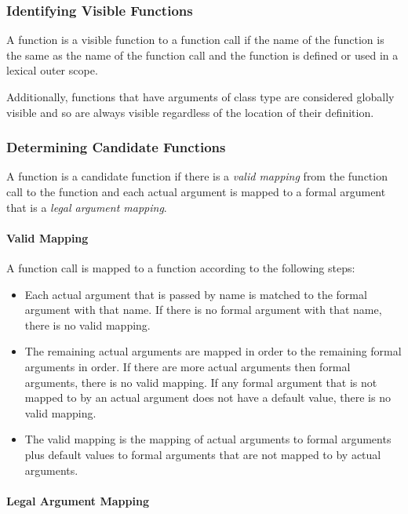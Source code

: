 \subsubsection{Identifying Visible Functions}
\label{Identifying_Visible_Functions}

A function is a visible function to a function call if the name of the
function is the same as the name of the function call and the function
is defined or used in a lexical outer scope.

Additionally, functions that have arguments of class type are
considered globally visible and so are always visible regardless of
the location of their definition.

\subsubsection{Determining Candidate Functions}
\label{Determining_Candidate_Functions}

A function is a candidate function if there is a {\em valid mapping}
from the function call to the function and each actual argument is
mapped to a formal argument that is a {\em legal argument mapping}.

\paragraph{Valid Mapping}

A function call is mapped to a function according to the following
steps:
\begin{itemize}
\item
Each actual argument that is passed by name is matched to the formal
argument with that name.  If there is no formal argument with that
name, there is no valid mapping.
\item
The remaining actual arguments are mapped in order to the remaining
formal arguments in order.  If there are more actual arguments then
formal arguments, there is no valid mapping.  If any formal argument
that is not mapped to by an actual argument does not have a default
value, there is no valid mapping.
\item
The valid mapping is the mapping of actual arguments to formal
arguments plus default values to formal arguments that are not mapped
to by actual arguments.
\end{itemize}

\paragraph{Legal Argument Mapping}

